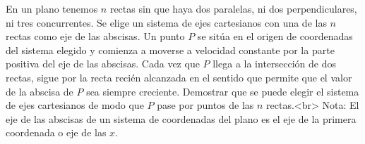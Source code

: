 En un plano tenemos $n$ rectas sin que haya dos paralelas, ni dos perpendiculares, ni tres concurrentes. Se elige un sistema de ejes cartesianos con una de las $n$ rectas como eje de las abscisas. Un punto $P$ se sitúa en el origen de coordenadas del sistema elegido y comienza a moverse a velocidad constante por la parte positiva del eje de las abscisas. Cada vez que $P$ llega a la intersección de dos rectas, sigue por la recta recién alcanzada en el sentido que permite que el valor de la abscisa de $P$ sea siempre creciente. Demostrar que se puede elegir el sistema de ejes cartesianos de modo que $P$ pase por puntos de las $n$ rectas.<br>
Nota: El eje de las abscisas de un sistema de coordenadas del plano es el eje de la primera coordenada o eje de las $x$.

